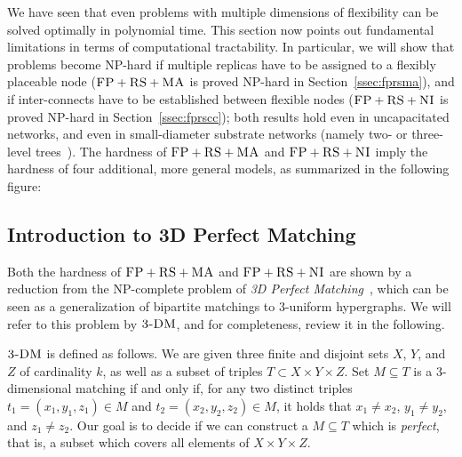 \documentclass[9pt]{sigcomm-alternate}
\newcommand{\CC}{\textsc{NI}}
\newcommand{\FP}{\textsc{FP}}
\newcommand{\RS}{\textsc{RS}}
\newcommand{\MA}{\textsc{MA}}
\newcommand{\TDM}{\textsc{3-DM}}
\begin{document}
We have seen that even problems with multiple dimensions of
flexibility can be solved optimally in polynomial time.
This section now points out fundamental
limitations in terms of computational tractability. In particular, we
will show that problems become NP-hard if multiple replicas have to be
assigned to a flexibly placeable node ($\FP+\RS+\MA$ is proved NP-hard in
Section~\ref{ssec:fprsma}), and if inter-connects have to be established
between flexible nodes ($\FP+\RS+\CC$ is proved NP-hard in Section~\ref{ssec:fprscc}); both
results hold even in uncapacitated networks, and even in small-diameter
substrate networks (namely two- or three-level trees~\cite{fattree}).
The hardness of $\FP+\RS+\MA$ and $\FP+\RS+\CC$ imply
the hardness of four additional, more general models, as
summarized in the following figure:

\begin{figure}[htbp]
\small
\end{figure}


\subsection{Introduction to 3D Perfect Matching}

Both the hardness of $\FP+\RS+\MA$ and $\FP+\RS+\CC$ are shown by a reduction
from the NP-complete problem of \emph{3D Perfect Matching}~\cite{3dmatch},
which
can be seen as a generalization of bipartite matchings to 3-uniform
hypergraphs. We will refer to this problem by $\TDM$, and for completeness,
review it in the following.

$\TDM$ is defined as follows. We are given three finite and disjoint
sets $X$, $Y$, and $Z$ of cardinality $k$, as well as a subset of triples $T\subset
X \times Y \times Z$.  Set $M \subseteq T$ is a 3-dimensional matching
if and only if, for any two distinct triples $t_1=(x_1, y_1, z_1) \in M$
and $t_2=(x_2, y_2, z_2) \in M$, it holds that $x_1\neq x_2$, $y_1\neq
y_2$, and $z_1\neq z_2$. Our goal is to decide if we can construct
a $M \subseteq T$ which is \emph{perfect}, that is, a subset which covers all
elements of $X \times Y \times Z$.
\end{document}
